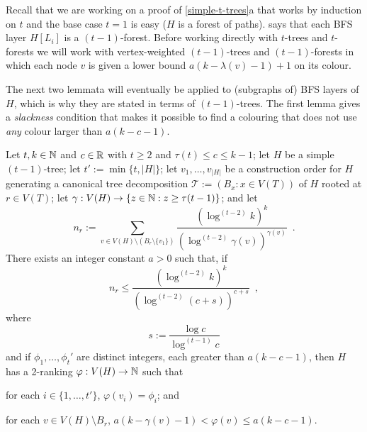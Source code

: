 \documentclass[kpfonts]{patmorin}
\theoremstyle{named}
\newcommand{\weirdref}[2]{\cref{#1}#2}
\begin{document}
Recall that we are working on a proof of \weirdref{simple-t-trees}{a} that works by induction on $t$ and the base case $t=1$ is easy ($H$ is a forest of paths).  says that each BFS layer $H[L_i]$ is a $(t-1)$-forest.  Before working directly with $t$-trees and $t$-forests we will work with vertex-weighted $(t-1)$-trees and $(t-1)$-forests in which each node $v$ is given a lower bound $a(k-\lambda(v)-1)+1$ on its colour.

The next two lemmata will eventually be applied to (subgraphs of) BFS layers of $H$, which is why they are stated in terms of $(t-1)$-trees.  The first lemma gives a \emph{slackness} condition that makes it possible to find a colouring that does not use \emph{any} colour larger than $a(k-c-1)$.

\begin{lem}\label{t-tree-slack}
Let $t,k\in\mathbb{N}$ and $c\in\mathbb{R}$ with $t\ge 2$ and $\tau(t)\le c\le k-1$; let $H$ be a simple $(t-1)$-tree; let $t':=\min\{t, |H|\}$; let $v_1,\ldots,v_{|H|}$ be a construction order for $H$ generating a canonical tree decomposition $\mathcal{T}:=(B_x:x\in V(T))$ of $H$ rooted at $r\in V(T)$; let $\gamma:V(H)\to\{z\in\mathbb{N}: z\ge \tau(t-1)\}$; and let
\[
    n_r:=\sum_{v\in V(H)\setminus (B_r\setminus\{v_1\})} \frac{\left(\log^{(t-2)} k\right)^k}{\left(\log^{(t-2)} \gamma(v)\right)^{\gamma(v)}} \enspace .
\]
There exists an integer constant $a>0$ such that,
if
\begin{equation}
     n_r \le \frac{(\log^{(t-2)} k)^k}{\left(\log^{(t-2)} (c + s)\right)^{c+s}} \enspace ,
 \label{total-weight-i}
\end{equation}
where
\[
    s := \frac{\log c}{\log^{(t-1)} c}
\]
and if $\phi_1,\ldots,\phi_t'$ are distinct integers, each greater than $a(k-c-1)$,
then $H$ has a 2-ranking $\varphi:V(H)\to\mathbb{N}$ such that
\begin{compactenum}[(P1)]
    \item for each $i\in\{1,\ldots,{t'}\}$, $\varphi(v_i)=\phi_i$; and
    \item for each $v\in V(H)\setminus B_r$, $a(k-\gamma(v)-1) < \varphi(v) \le a(k-c-1)$.
\end{compactenum}
\end{lem}
\end{document}
